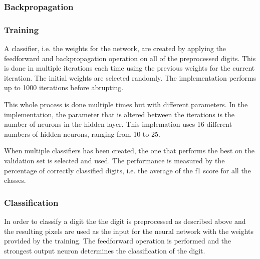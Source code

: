 \documentclass[report.tex]{subfile}
\begin{document}
\subsubsection{Backpropagation}

\subsubsection{Training}
A classifier, i.e. the weights for the network, are created by applying the
feedforward and backpropagation operation on all of the preprocessed digits.
This is done in multiple iterations each time using the previous weights for
the current iteration. The initial weights are selected randomly. The
implementation performs up to 1000 iterations before abrupting.

This whole process is done multiple times but with different parameters. In the
implementation, the parameter that is altered between the iterations is the
number of neurons in the hidden layer. This implemation uses 16 different
numbers of hidden neurons, ranging from 10 to 25. 

When multiple classifiers has been created, the one that performs the best on
the validation set is selected and used. The performance is measured by the
percentage of correctly classified digits, i.e. the average of the f1 score for
all the classes.

\subsubsection{Classification}
In order to classify a digit the the digit is preprocessed as described above
and the resulting pixels are used as the input for the neural network with the
weights provided by the training. The feedforward operation is performed and
the strongest output neuron determines the classification of the digit.
\end{document}
